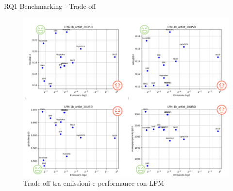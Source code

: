 \begin{frame}{RQ1 Benchmarking - Trade-off}
    \vspace{-0.9cm}
    \begin{figure}[H]
    \centering
    \includegraphics[width=\linewidth,height=0.85\textheight,keepaspectratio]{images/TradeOff.png}
    \caption{Trade-off tra emissioni e performance con LFM}
    \end{figure}
\end{frame}
